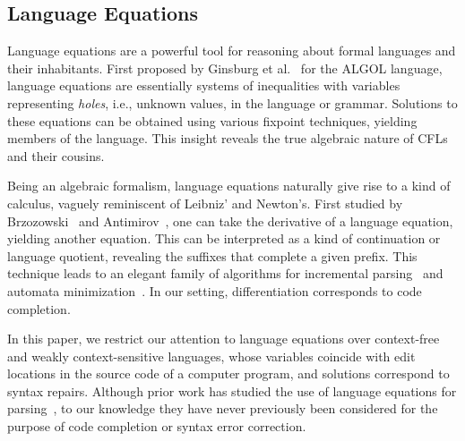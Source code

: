 \documentclass[sigplan,review,anonymous,acmsmall]{acmart}\settopmatter{printfolios=false,printccs=false,printacmref=false}
\begin{document}


\subsection{Language Equations}

Language equations are a powerful tool for reasoning about formal languages and their inhabitants. First proposed by Ginsburg et al.~\cite{ginsburg1962two} for the ALGOL language, language equations are essentially systems of inequalities with variables representing \textit{holes}, i.e., unknown values, in the language or grammar. Solutions to these equations can be obtained using various fixpoint techniques, yielding members of the language. This insight reveals the true algebraic nature of CFLs and their cousins.

Being an algebraic formalism, language equations naturally give rise to a kind of calculus, vaguely reminiscent of Leibniz' and Newton's. First studied by Brzozowski~\cite{brzozowski1964derivatives, brzozowski1980equations} and Antimirov~\cite{antimirov1996partial}, one can take the derivative of a language equation, yielding another equation. This can be interpreted as a kind of continuation or language quotient, revealing the suffixes that complete a given prefix. This technique leads to an elegant family of algorithms for incremental parsing~\cite{might2011parsing, adams2016complexity} and automata minimization~\cite{brzozowski1962canonical}. In our setting, differentiation corresponds to code completion.

In this paper, we restrict our attention to language equations over context-free and weakly context-sensitive languages, whose variables coincide with edit locations in the source code of a computer program, and solutions correspond to syntax repairs. Although prior work has studied the use of language equations for parsing~\cite{might2011parsing}, to our knowledge they have never previously been considered for the purpose of code completion or syntax error correction.


\end{document}
